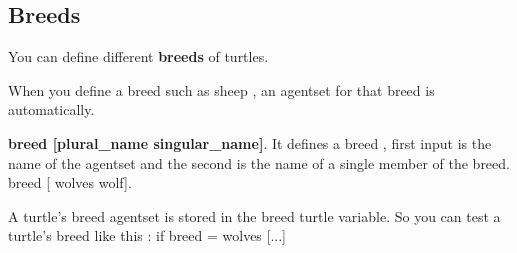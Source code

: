 \documentclass{article}
\begin{document}
\subsection{Breeds}

You can define different \textbf{breeds} of turtles.

When you define a breed such as sheep , an agentset for that breed is automatically.

\textbf{breed [plural\_name singular\_name]}. It defines a breed , first input is the name of the agentset and the second is the name of a single member of the breed. breed [ wolves wolf].

A turtle's breed agentset is stored in the breed turtle variable. So you can test a turtle's breed like this : if breed = wolves [...]
\end{document}
